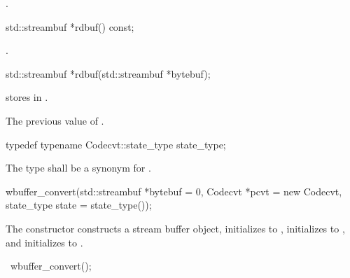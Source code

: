 \begin{itemdescr}
\pnum
\returns {}.
\end{itemdescr}

%
%
\begin{itemdecl}
std::streambuf *rdbuf() const;
\end{itemdecl}

\begin{itemdescr}
\pnum
\returns {}.
\end{itemdescr}

%
%
\begin{itemdecl}
std::streambuf *rdbuf(std::streambuf *bytebuf);
\end{itemdecl}

\begin{itemdescr}
\pnum
\effects stores  in .

\pnum
\returns The previous value of .
\end{itemdescr}

%
%
\begin{itemdecl}
typedef typename Codecvt::state_type state_type;
\end{itemdecl}

\begin{itemdescr}
\pnum
The type shall be a synonym for .
\end{itemdescr}

%
\begin{itemdecl}
wbuffer_convert(std::streambuf *bytebuf = 0,
    Codecvt *pcvt = new Codecvt, state_type state = state_type());
\end{itemdecl}

\begin{itemdescr}
\pnum
\effects The constructor constructs a stream buffer object, initializes
 to , initializes 
to , and initializes  to .
\end{itemdescr}

%
\begin{itemdecl}
~wbuffer_convert();
\end{itemdecl}

